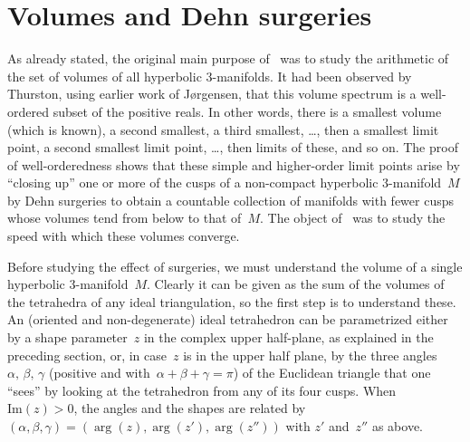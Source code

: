 \documentclass[12pt,reqno]{amsart}
\theoremstyle{definition}
\def\b{\beta}
\def\a{\alpha}
\def\Im{\mathrm{Im}}
\def\g{\gamma}
\begin{document}

\section{Volumes and Dehn surgeries}
\label{sec.3}
 
As already stated, the original main purpose of~\cite{NZ} was to study the arithmetic of 
the set of volumes of all hyperbolic 3-manifolds. It had been observed by Thurston, using
earlier work of J\o rgensen, that this volume spectrum is a well-ordered subset of the
positive reals.
In other words, there is a smallest volume (which is known), a second smallest, a third 
smallest, \dots, then a smallest limit point, a second smallest limit point, \dots, then
limits of 
these, and so on.  The proof of well-orderedness shows that these simple and higher-order
limit
points arise by ``closing up''  one or more of the cusps of a non-compact hyperbolic
3-manifold~$M$ by Dehn surgeries to obtain
a countable collection of manifolds with fewer cusps whose volumes tend from below to 
that of~$M$.  The object of~\cite{NZ} was to study the speed with which these volumes converge.

Before studying the effect of surgeries, we must understand the volume of a single hyperbolic 
3-manifold~$M$.  Clearly it can be given as the sum of the volumes of the tetrahedra of any
ideal triangulation, so the
first step is to understand these.  An (oriented and non-degenerate) ideal tetrahedron can be 
parametrized either by a shape parameter~$z$ in the complex upper half-plane, as explained in
the preceding section, or, in case~$z$ is in the upper half plane,
by the three angles $\a,\,\b,\,\g$ (positive and
with~$\a+\b+\g=\pi$) of the Euclidean triangle that one ``sees'' by looking at the
tetrahedron from any of its four cusps. When $\Im(z)>0$, the angles and the shapes are
related by $(\a,\b,\g)=(\arg(z),\arg(z'),\arg(z''))$ with $z'$ and~$z''$ as above.
\end{document}
